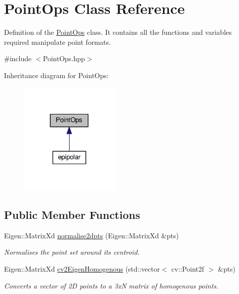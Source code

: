 \hypertarget{class_point_ops}{}\section{Point\+Ops Class Reference}
\label{class_point_ops}


Definition of the \hyperlink{class_point_ops}{Point\+Ops} class. It contains all the functions and variables required manipulate point formats.  




{\ttfamily \#include $<$Point\+Ops.\+hpp$>$}



Inheritance diagram for Point\+Ops\+:\nopagebreak
\begin{figure}[H]
\begin{center}
\leavevmode
\includegraphics[width=137pt]{class_point_ops__inherit__graph}
\end{center}
\end{figure}
\subsection*{Public Member Functions}
\begin{DoxyCompactItemize}
\item 
Eigen\+::\+Matrix\+Xd \hyperlink{class_point_ops_aedd3f88c0e3eccd17085585cdd85319a}{normalise2dpts} (Eigen\+::\+Matrix\+Xd \&pts)
\begin{DoxyCompactList}\small\item\em Normalises the point set around its centroid. \end{DoxyCompactList}\item 
Eigen\+::\+Matrix\+Xd \hyperlink{class_point_ops_a850c1cf8569537a6ec70dc2721c4ab1f}{cv2\+Eigen\+Homogenous} (std\+::vector$<$ cv\+::\+Point2f $>$ \&pts)
\begin{DoxyCompactList}\small\item\em Converts a vector of 2D points to a 3xN matrix of homogenous points. \end{DoxyCompactList}\end{DoxyCompactItemize}



